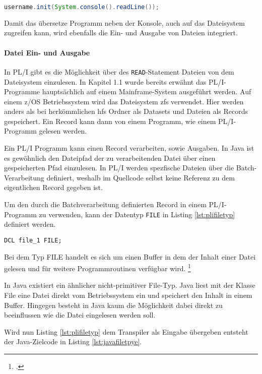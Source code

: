 \begin{lstlisting}[language=Java, caption=Java übersetzung des Display-Reply-Statments, label={lst:javadisplay}]
username.init(System.console().readLine()); 
\end{lstlisting} 

Damit das übersetze Programm neben der Konsole, auch auf das Dateisystem zugreifen kann, wird ebenfalls die Ein- und Ausgabe von Dateien integriert.

\paragraph{Datei Ein- und Ausgabe}
In PL/I gibt es die Möglichkeit über des \verb+READ+-Statement Dateien von dem Dateisystem einzulesen.
In Kapitel 1.1 wurde bereits erwähnt das PL/I-Programme hauptsächlich auf einem Mainframe-System ausgeführt werden.
Auf einem z/OS Betriebssystem wird das Dateisystem \ac{zfs} verwendet.
Hier werden anders als bei herkömmlichen \ac{hfs} Ordner als Datasets und Dateien als Records gespeichert.
Ein Record kann dann von einem Programm, wie einem PL/I-Programm gelesen werden.

Ein PL/I Programm kann einen Record verarbeiten, sowie Ausgaben. In Java ist es gewöhnlich den Dateipfad der zu verarbeitenden Datei über einen gespeicherten Pfad einzulesen.
In PL/I werden spezfische Dateien über die Batch-Verarbeitung definiert, weshalb im Quellcode selbst keine Referenz zu dem eigentlichen Record gegeben ist.

Um den durch die Batchverarbeitung definierten Record in einem PL/I-Programm zu verwenden, kann der Datentyp \verb+FILE+ in Listing \ref{lst:plifiletyp} definiert werden.

\begin{lstlisting}[language=PL/I, caption=FILE Typ in PL/I, label={lst:plifiletyp}]
DCL file_1 FILE;
\end{lstlisting} 

Bei dem Typ FILE handelt es sich um einen Buffer in dem der Inhalt einer Datei gelesen und für weitere Programmroutinen verfügbar wird. \footcite[Vgl. ][ S.305ff. ]{pliref}

In Java existiert ein ähnlicher nicht-primitiver File-Typ.
Java liest mit der Klasse File eine Datei direkt vom Betriebssystem ein und speichert den Inhalt in einem Buffer. 
Hingegen besteht in Java kaum die Möglichkeit dabei direkt zu beeinflussen wie die Datei eingelesen werden soll. 

Wird nun Listing \ref{lst:plifiletyp} dem Transpiler als Eingabe übergeben entsteht der Java-Zielcode in Listing \ref{lst:javafiletpye}.


